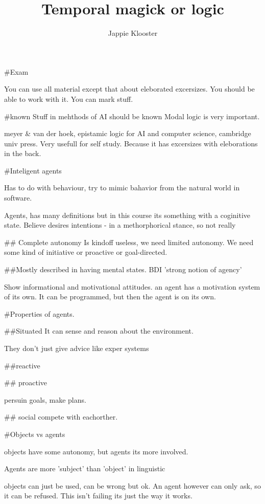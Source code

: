 \documentclass{article}
\begin{document}
\author{Jappie Klooster}
\title{Temporal magick or logic}
\maketitle

#Exam

You can use all material except that about eleborated excersizes.
You should be able to work with it. You can mark stuff.

#known
Stuff in mehthods of AI should be known
Modal logic is very important.

meyer & van der hoek, epistamic logic for AI and computer science, cambridge
univ press.
Very usefull for self study. Because it has excersizes with eleborations in
the back.

#Inteligent agents

Has to do with behaviour, try to mimic bahavior from the natural world in
software.

Agents, has many definitions but in this course its something with a
coginitive state.
Believe desires intentions - in a methorphorical stance, so not really

## Complete autonomy
Is kindoff useless, we need limited autonomy.
We need some kind of initiative or proactive or goal-directed.

##Mostly described in having mental states.
BDI 'strong notion of agency'

Show informational and motivational attitudes. an agent has a
motivation system of its own. It can be programmed, but then
the agent is on its own.

#Properties of agents.

##Situated
It can sense and reason about the environment.

They don't just give advice like exper systems

##reactive

## proactive

persuin goals, make plans.


## social
compete with eachorther.

#Objects vs agents

objects have some autonomy, but agents its more involved.

Agents are more 'subject' than 'object' in linguistic

objects can just be used, can be wrong but ok. An agent however
can only ask, so it can be refused. This isn't failing
its just the way it works.
\end{document}
